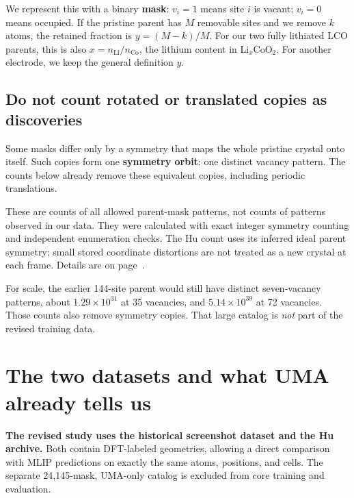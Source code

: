 We represent this with a binary \textbf{mask}: $v_i=1$ means site $i$ is vacant; $v_i=0$ means occupied. If the pristine parent has $M$ removable sites and we remove $k$ atoms, the retained fraction is $y=(M-k)/M$. For our two fully lithiated LCO parents, this is also $x=n_{\mathrm{Li}}/n_{\mathrm{Co}}$, the lithium content in Li$_x$CoO$_2$. For another electrode, we keep the general definition $y$.

\subsection*{Do not count rotated or translated copies as discoveries}
Some masks differ only by a symmetry that maps the whole pristine crystal onto itself. Such copies form one \textbf{symmetry orbit}: one distinct vacancy pattern. The counts below already remove these equivalent copies, including periodic translations.

\begin{center}\small

\end{center}
These are counts of all allowed parent-mask patterns, not counts of patterns observed in our data. They were calculated with exact integer symmetry counting and independent enumeration checks. The Hu count uses its inferred ideal parent symmetry; small stored coordinate distortions are not treated as a new crystal at each frame. Details are on page~\pageref{sec:symmetry}.

For scale, the earlier 144-site parent would still have \textbf{\FutureSeven{}} distinct seven-vacancy patterns, about $1.29\times10^{31}$ at 35 vacancies, and $5.14\times10^{39}$ at 72 vacancies. Those counts also remove symmetry copies. That large catalog is \emph{not} part of the revised training data.


\clearpage
\section{The two datasets and what UMA already tells us}

\textbf{The revised study uses the historical screenshot dataset and the Hu archive.} Both contain DFT-labeled geometries, allowing a direct comparison with MLIP predictions on exactly the same atoms, positions, and cells. The separate 24,145-mask, UMA-only catalog is excluded from core training and evaluation.

